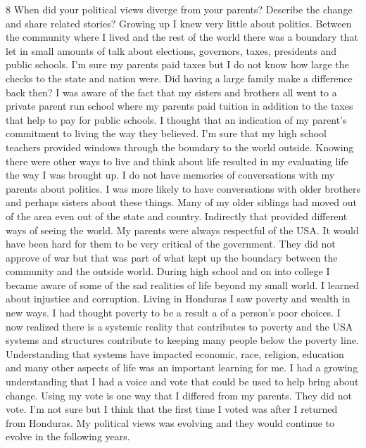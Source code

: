 8 When did your political views diverge from your parents? Describe the change and share related stories?
Growing up I knew very little about politics. Between the community where I lived and the rest of the world there was a boundary that let in small amounts of talk about elections, governors, taxes, presidents and public schools. I'm sure my parents paid taxes but I do not know how large the checks to the state and nation were. Did having a large family make a difference back then? I was aware of the fact that my sisters and brothers all went to a private parent run school where my parents paid tuition in addition to the taxes that help to pay for public schools. I thought that an indication of my parent's commitment to living the way they believed. 
I'm sure that my high school teachers provided windows through the boundary to the world outside. Knowing there were other ways to live and think about life resulted in my evaluating life the way I was brought up. I do not have memories of conversations with my parents about politics. I was more likely to have conversations with older brothers and perhaps sisters about these things. Many of my older siblings had moved out of the area even out of the state and country. Indirectly that provided different ways of seeing the world. My parents were always respectful of the USA. It would have been hard for them to be very critical of the government. They did not approve of war but that was part of what kept up the boundary between the community and the outside world. During high school and on into college I became aware of some of the sad realities of life beyond my small world. I learned about injustice and corruption. 
Living in Honduras I saw poverty and wealth in new ways.
I had thought poverty to be a result a of a person's poor choices. I now realized there is a systemic reality that contributes to poverty and the USA systems and structures contribute to keeping many people below the poverty line. Understanding that systems have impacted economic, race, religion, education and many other aspects of life was an important learning for me. I had a growing understanding that I had a voice and vote that could be used to help bring about change.
Using my vote is one way that I differed from my parents. They did not vote. I'm not sure but I think that the first time I voted was after I returned from Honduras. My political views was evolving and they would continue to evolve in the following years.
